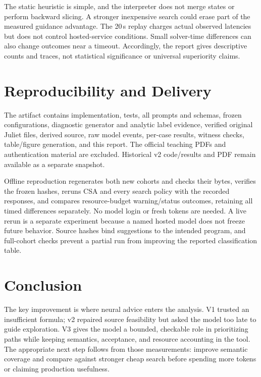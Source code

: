 \documentclass[sigconf]{acmart}
\begin{document}
The static heuristic is simple, and the interpreter does not merge states
or perform backward slicing. A stronger inexpensive search could erase
part of the measured guidance advantage. The 20\,s replay charges actual
observed latencies but does not control hosted-service conditions.
Small solver-time differences can also change outcomes near a timeout.
Accordingly, the report gives descriptive counts and traces, not
statistical significance or universal superiority claims.

\section{Reproducibility and Delivery}
The artifact contains implementation, tests, all prompts and schemas,
frozen configurations, diagnostic generator and analytic label evidence,
verified original Juliet files, derived source, raw model events,
per-case results, witness checks, table/figure generation, and this report.
The official teaching PDFs and authentication material are excluded.
Historical v2 code/results and PDF remain available as a separate snapshot.

Offline reproduction regenerates both new cohorts and checks their bytes,
verifies the frozen hashes, reruns CSA and every search policy with the
recorded responses, and compares resource-budget warning/status outcomes,
retaining all timed differences separately. No model login
or fresh tokens are needed. A live rerun is a separate experiment because
a named hosted model does not freeze future behavior. Source hashes bind
suggestions to the intended program, and full-cohort checks prevent a
partial run from improving the reported classification table.

\ReproductionResultsVThree{}
\PublicationStatusVThree{}

\section{Conclusion}
The key improvement is where neural advice enters the analysis. V1
trusted an insufficient formula; v2 repaired source feasibility but asked
the model too late to guide exploration. V3 gives the model a bounded,
checkable role in prioritizing paths while keeping semantics, acceptance,
and resource accounting in the tool.
\ConclusionResultsVThree{}
The appropriate next step follows from those measurements: improve
semantic coverage and compare against stronger cheap search before
spending more tokens or claiming production usefulness.
\end{document}
